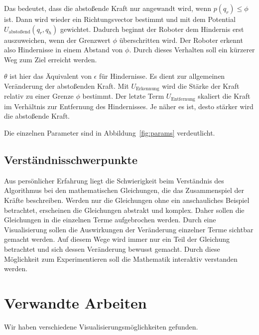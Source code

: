 Das bedeutet, dass die abstoßende Kraft nur angewandt wird, wenn $p(q_r) \leq \phi$ ist. 
Dann wird wieder ein Richtungsvector bestimmt und mit dem Potential $U_{\text{abstoßend}}(q_r, q_h)$ gewichtet.
Dadurch beginnt der Roboter dem Hindernis erst auszuweichen, wenn der Grenzwert $\phi$ überschritten wird.
Der Roboter erkennt also Hindernisse in einem Abstand von $\phi$.
Durch dieses Verhalten soll ein kürzerer Weg zum Ziel erreicht werden.

$\theta$ ist hier das Äquivalent von $\epsilon$ für Hindernisse. 
Es dient zur allgemeinen Veränderung der abstoßenden Kraft.
Mit $U_{\text{Erkennung}}$ wird die Stärke der Kraft relativ zu einer Grenze $\phi$ bestimmt.
Der letzte Term $U_{\text{Entfernung}}$ skaliert die Kraft im Verhältnis zur Entfernung des Hindernisses. Je näher es ist, desto stärker wird die abstoßende Kraft.

Die einzelnen Parameter sind in Abbildung~\vref{fig:params} verdeutlicht.


\subsection{Verständnisschwerpunkte}
Aus persönlicher Erfahrung liegt die Schwierigkeit beim Verständnis des Algorithmus bei den mathematischen Gleichungen, die das Zusammenspiel der Kräfte beschreiben.
Werden nur die Gleichungen ohne ein anschauliches Beispiel betrachtet, erscheinen die Gleichungen abstrakt und  komplex.
Daher sollen die Gleichungen in die einzelnen Terme aufgebrochen werden.
Durch eine Visualisierung sollen die Auswirkungen der Veränderung einzelner Terme sichtbar gemacht werden.
Auf diesem Wege wird immer nur ein Teil der Gleichung betrachtet und sich dessen Veränderung bewusst gemacht.
Durch diese Möglichkeit zum Experimentieren soll die Mathematik interaktiv verstanden werden. 

\section{Verwandte Arbeiten}

Wir haben verschiedene Visualisierungsmöglichkeiten gefunden.

